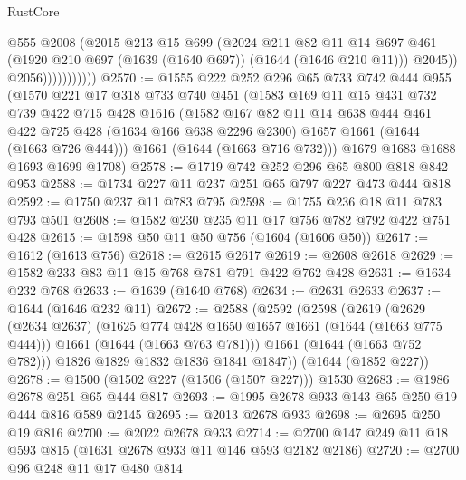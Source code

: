 \begin{lexlean}{RustCore}
\begin{coremodule}
                          @555
                          @2008
                          (@2015
                            @213
                            @15
                            @699
                            (@2024
                              @211
                              @82
                              @11
                              @14
                              @697
                              @461
                              (@1920 @210 @697 (@1639 (@1640 @697)) (@1644 (@1646 @210 @11)))
                              @2045))
                          @2056)))))))))))
@2570 := @1555
    @222
    @252
    @296
    @65
    @733
    @742
    @444
    @955
    (@1570
      @221
      @17
      @318
      @733
      @740
      @451
      (@1583
        @169
        @11
        @15
        @431
        @732
        @739
        @422
        @715
        @428
        @1616
        (@1582
          @167
          @82
          @11
          @14
          @638
          @444
          @461
          @422
          @725
          @428
          (@1634 @166 @638 @2296 @2300)
          @1657
          @1661
          (@1644 (@1663 @726 @444)))
        @1661
        (@1644 (@1663 @716 @732)))
      @1679
      @1683
      @1688
      @1693
      @1699
      @1708)
@2578 := @1719 @742 @252 @296 @65 @800 @818 @842 @953
@2588 := @1734 @227 @11 @237 @251 @65 @797 @227 @473 @444 @818
@2592 := @1750 @237 @11 @783 @795
@2598 := @1755 @236 @18 @11 @783 @793 @501
@2608 := @1582 @230 @235 @11 @17 @756 @782 @792 @422 @751 @428
@2615 := @1598 @50 @11 @50 @756 (@1604 (@1606 @50))
@2617 := @1612 (@1613 @756)
@2618 := @2615 @2617
@2619 := @2608 @2618
@2629 := @1582 @233 @83 @11 @15 @768 @781 @791 @422 @762 @428
@2631 := @1634 @232 @768
@2633 := @1639 (@1640 @768)
@2634 := @2631 @2633
@2637 := @1644 (@1646 @232 @11)
@2672 := @2588
    (@2592
      (@2598
        (@2619
          (@2629
            (@2634 @2637)
            (@1625 @774 @428 @1650 @1657 @1661 (@1644 (@1663 @775 @444)))
            @1661
            (@1644 (@1663 @763 @781)))
          @1661
          (@1644 (@1663 @752 @782)))
        @1826
        @1829
        @1832
        @1836
        @1841
        @1847))
    (@1644 (@1852 @227))
@2678 := @1500 (@1502 @227 (@1506 (@1507 @227))) @1530
@2683 := @1986 @2678 @251 @65 @444 @817
@2693 := @1995 @2678 @933 @143 @65 @250 @19 @444 @816 @589 @2145
@2695 := @2013 @2678 @933
@2698 := @2695 @250 @19 @816
@2700 := @2022 @2678 @933
@2714 := @2700 @147 @249 @11 @18 @593 @815 (@1631 @2678 @933 @11 @146 @593 @2182 @2186)
@2720 := @2700 @96 @248 @11 @17 @480 @814

\end{coremodule}
\end{lexlean}
